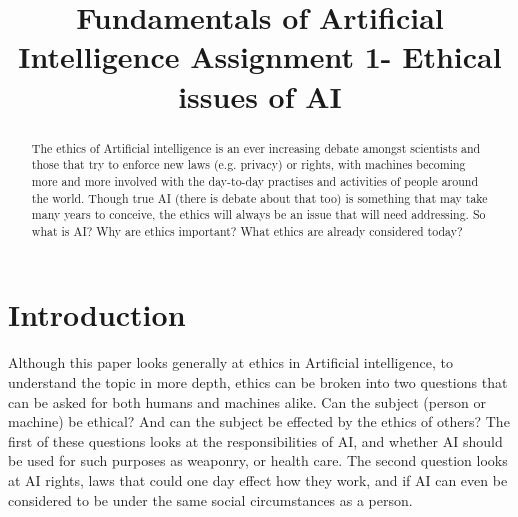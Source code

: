 \documentclass[article]{IEEEtran}
\begin{document}
\title{Fundamentals of Artificial Intelligence Assignment 1- Ethical issues of AI}

\author{
}

\maketitle

\begin{abstract}
The ethics of Artificial intelligence is an ever increasing debate amongst scientists and those that try to enforce new laws (e.g. privacy) or rights, with machines becoming more and more involved with the day-to-day practises and activities of people around the world. Though true AI (there is debate about that too) is something that may take many years to conceive, the ethics will always be an issue that will need addressing. So what is AI? Why are ethics important? What ethics are already considered today?
\end{abstract}

\section{Introduction}
Although this paper looks generally at ethics in Artificial intelligence, to understand the topic in more depth, ethics can be broken into two questions that can be asked for both humans and machines alike. Can the subject (person or machine) be ethical? And can the subject be effected by the ethics of others? The first of these questions looks at the responsibilities of AI, and whether AI should be used for such purposes as weaponry, or health care. The second question looks at AI rights, laws that could one day effect how they work, and if AI can even be considered to be under the same social circumstances as a person.
\end{document}
